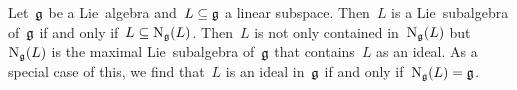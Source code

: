 \begin{remark}
 Let~$\mathfrak{g}$ be a Lie~algebra and~$L \subseteq \mathfrak{g}$ a linear subspace.
 Then~$L$ is a Lie~subalgebra of~$\mathfrak{g}$ if and only if~$L \subseteq \operatorname{N}_{\mathfrak{g}}(L)$.
 Then~$L$ is not only contained in~$\operatorname{N}_{\mathfrak{g}}(L)$ but~$\operatorname{N}_{\mathfrak{g}}(L)$ is the maximal Lie~subalgebra of~$\mathfrak{g}$ that contains~$L$ as an ideal.
 As a special case of this, we find that~$L$ is an ideal in~$\mathfrak{g}$ if and only if~$\operatorname{N}_{\mathfrak{g}}(L) = \mathfrak{g}$.
\end{remark}
% 
% 
% 
% 
% 
% 
% 
% 
% 
% 
% 
% 
% 
